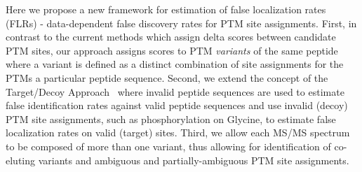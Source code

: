 \documentclass[11pt]{article}
\begin{document}

Here we propose a new framework for estimation of false localization rates (FLRs) \-- data-dependent false discovery rates for PTM site assignments. First, in contrast to the current methods which assign delta scores between candidate PTM sites, our approach assigns scores to PTM {\em variants} of the same peptide where a variant is defined as a distinct combination of site assignments for the PTMs a particular peptide sequence. Second, we extend the concept of the Target/Decoy Approach~\cite{elias07} where invalid peptide sequences are used to estimate false identification rates against valid peptide sequences and use invalid (decoy) PTM site assignments, such as phosphorylation on Glycine, to estimate false localization rates on valid (target) sites. Third, we allow each MS/MS spectrum to be composed of more than one variant, thus allowing for identification of co-eluting variants and ambiguous and partially-ambiguous PTM site assignments.


\end{document}

